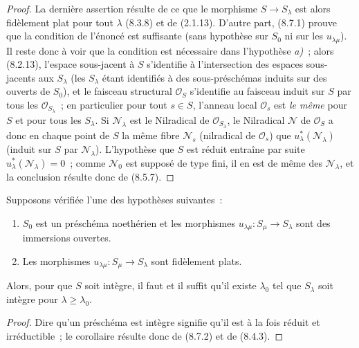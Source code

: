 \begin{proof}
La dernière assertion résulte de ce que le morphisme $S\to S_\lambda$ est
alors fidèlement plat pour tout $\lambda$ (8.3.8) et de (2.1.13). D'autre part,
(8.7.1) prouve que la condition de l'énoncé est suffisante (sans hypothèse sur
$S_0$ ni sur les $u_{\lambda\mu}$). Il reste donc à voir que la condition est
nécessaire dans l'hypothèse \emph{a)}~; alors (8.2.13), l'espace sous-jacent à
$S$ s'identifie à l'intersection des espaces sous-jacents aux $S_\lambda$ (les
$S_\lambda$ étant identifiés à des sous-préschémas induits sur des ouverts de
$S_0$), et le faisceau structural $\mathcal O_S$ s'identifie au
faisceau induit sur $S$ par tous les $\mathcal O_{S_\lambda}$~; en particulier
pour tout $s\in S$, l'anneau local $\mathcal O_s$ est \emph{le même} pour $S$
et pour tous les $S_\lambda$. Si $\mathcal N_\lambda$ est le Nilradical de
$\mathcal O_{S_\lambda}$, le Nilradical $\mathcal N$ de $\mathcal O_S$ a donc
en chaque point de $S$ la même fibre $\mathcal N_s$ (nilradical de
$\mathcal O_s$) que $u_\lambda^*(\mathcal N_\lambda)$ (induit sur $S$ par
$\mathcal N_\lambda$). L'hypothèse que $S$ est réduit entraîne par suite
$u_\lambda^*(\mathcal N_\lambda)=0$~; comme $\mathcal N_0$ est supposé de
type fini, il en est de même des $\mathcal N_\lambda$, et la conclusion résulte
donc de (8.5.7).
\end{proof}

\begin{corollary}[8.7.3]
\label{IV.8.7.3-fr}
Supposons vérifiée \textup{l'une} des hypothèses suivantes~:
\begin{enumerate}
\item[\emph{a)}] $S_0$ est un préschéma noethérien et les morphismes
$u_{\lambda\mu}:S_\mu\to S_\lambda$ sont des immersions ouvertes.
\item[\emph{b)}] Les morphismes $u_{\lambda\mu}:S_\mu\to S_\lambda$ sont
fidèlement plats.
\end{enumerate}

Alors, pour que $S$ soit intègre, il faut et il suffit qu'il existe
$\lambda_0$ tel que $S_\lambda$ soit intègre pour $\lambda\geq\lambda_0$.
\end{corollary}

\begin{proof}
Dire qu'un préschéma est intègre signifie qu'il est à la fois réduit et
irréductible~; le corollaire résulte donc de (8.7.2) et de (8.4.3).
\end{proof}

